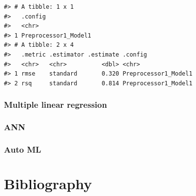 \documentclass[
  letterpaper,
  DIV=11,
  numbers=noendperiod]{scrreprt}
\begin{document}
\begin{verbatim}
#> # A tibble: 1 x 1
#>   .config             
#>   <chr>               
#> 1 Preprocessor1_Model1
#> # A tibble: 2 x 4
#>   .metric .estimator .estimate .config             
#>   <chr>   <chr>          <dbl> <chr>               
#> 1 rmse    standard       0.320 Preprocessor1_Model1
#> 2 rsq     standard       0.814 Preprocessor1_Model1
\end{verbatim}

\hypertarget{multiple-linear-regression}{%
\subsection{Multiple linear
regression}\label{multiple-linear-regression}}

\hypertarget{ann}{%
\subsection{ANN}\label{ann}}

\hypertarget{auto-ml}{%
\subsection{Auto ML}\label{auto-ml}}


\hypertarget{section}{%
\chapter{}\label{section}}


\hypertarget{bibliography}{%
\chapter*{Bibliography}\label{bibliography}}

\end{document}
